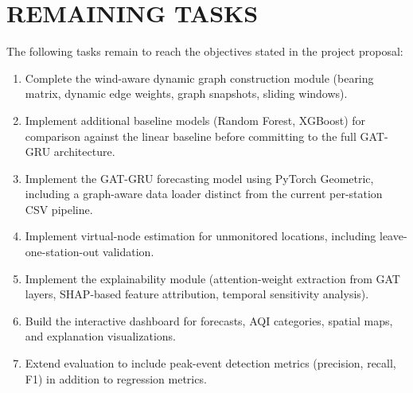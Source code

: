 \chapter{REMAINING TASKS}


The following tasks remain to reach the objectives stated in the project proposal:

\begin{enumerate}
    \item Complete the wind-aware dynamic graph construction module (bearing matrix, dynamic edge weights, graph snapshots, sliding windows).
    \item Implement additional baseline models (Random Forest, XGBoost) for comparison against the linear baseline before committing to the full GAT-GRU architecture.
    \item Implement the GAT-GRU forecasting model using PyTorch Geometric, including a graph-aware data loader distinct from the current per-station CSV pipeline.
    \item Implement virtual-node estimation for unmonitored locations, including leave-one-station-out validation.
    \item Implement the explainability module (attention-weight extraction from GAT layers, SHAP-based feature attribution, temporal sensitivity analysis).
    \item Build the interactive dashboard for forecasts, AQI categories, spatial maps, and explanation visualizations.
    \item Extend evaluation to include peak-event detection metrics (precision, recall, F1) in addition to regression metrics.
\end{enumerate}
